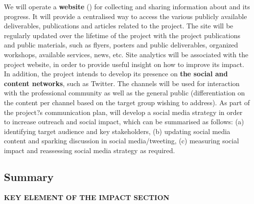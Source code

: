 We will operate a \textbf{website}
()
for collecting and sharing information about \TheProject and its progress.
It will provide a centralised way to access the various publicly available deliverables, publications
and articles related
to the project. The site will be regularly updated over the lifetime of the project
with the project publications and public materials, such as flyers, posters and
public deliverables, organized workshops, available services, news, etc.
Site analytics will be associated with the project website, in order
to provide useful insight on how to improve its impact. In addition, the project intends to
develop its presence on \textbf{the social and content
networks}, such as Twitter. The channels will be used for interaction
with the professional community as well as the general public
(differentiation on the content per channel based on the target group wishing to address).
As part of the project?s communication plan, \TheProject will develop a social media strategy
in order to increase outreach and social impact, which can be summarised as follows: (a) identifying target
audience and key stakeholders, (b) updating social media content and sparking
discussion in social media/tweeting, (c) measuring social impact and reassessing
social media strategy as required.

\clearpage
\subsection{Summary}


\textbf{KEY ELEMENT OF THE IMPACT SECTION}

\newlength{\savedparindent}
\newcommand{\summarybox}[2]{
\begin{framed}

\centerline{\textbf{ #1}}
\setlength{\savedparindent}{\parindent}
\par
\setlength{\parindent}{0pt}
{#2}
\setlength{\parindent}{\savedparindent}
\end{framed}
}


